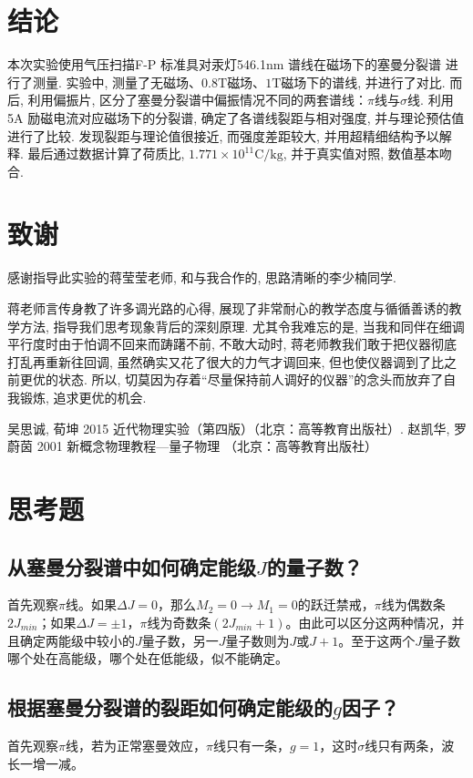 \documentclass[aps,pre,12pt,preprint,onecolumn,showpacs,showkeys]{revtex4-1}
\begin{document}
\section{结论}
本次实验使用气压扫描F-P 标准具对汞灯546.1nm 谱线在磁场下的塞曼分裂谱
进行了测量. 实验中, 测量了无磁场、$0.8\mathrm{T}$磁场、$1\mathrm{T}$磁场下的谱线, 并进行了对比. 而后, 利用偏振片, 区分了塞曼分裂谱中偏振情况不同的两套谱线：$\pi$线与$\sigma$线. 利用5A 励磁电流对应磁场下的分裂谱, 确定了各谱线裂距与相对强度, 并与理论预估值进行了比较. 发现裂距与理论值很接近, 而强度差距较大, 并用超精细结构予以解释. 最后通过数据计算了荷质比, $1.771\times10^{11} \mathrm{C}/\mathrm{kg}$, 并于真实值对照, 数值基本吻合. 

\section{致谢}
感谢指导此实验的蒋莹莹老师, 和与我合作的, 思路清晰的李少楠同学. 

蒋老师言传身教了许多调光路的心得, 展现了非常耐心的教学态度与循循善诱的教学方法, 指导我们思考现象背后的深刻原理. 尤其令我难忘的是, 当我和同伴在细调平行度时由于怕调不回来而踌躇不前, 不敢大动时, 蒋老师教我们敢于把仪器彻底打乱再重新往回调, 虽然确实又花了很大的力气才调回来, 但也使仪器调到了比之前更优的状态. 所以, 切莫因为存着“尽量保持前人调好的仪器”的念头而放弃了自我锻炼, 追求更优的机会. 

\begin{thebibliography}{}
 吴思诚, 荀坤 2015 近代物理实验（第四版）（北京：高等教育出版社）.
  赵凯华, 罗蔚茵 2001 新概念物理教程—量子物理 （北京：高等教育出版社）
\end{thebibliography}
\clearpage
\appendix
\section{思考题}
\subsection{从塞曼分裂谱中如何确定能级$J$的量子数？}
首先观察$\pi$线。如果$\Delta J=0$，那么$M_2=0\to M_1=0$的跃迁禁戒，$\pi$线为偶数条$2J_{min}$；如果$\Delta J=\pm 1$，$\pi$线为奇数条$(2 J_{min}+1)$。由此可以区分这两种情况，并且确定两能级中较小的$J$量子数，另一$J$量子数则为$J$或$J+1$。至于这两个$J$量子数哪个处在高能级，哪个处在低能级，似不能确定。

\subsection{根据塞曼分裂谱的裂距如何确定能级的$g$因子？}
首先观察$\pi$线，若为正常塞曼效应，$\pi$线只有一条，$g=1$，这时$\sigma$线只有两条，波长一增一减。
\end{document}
